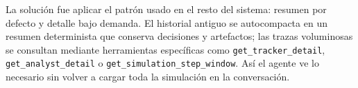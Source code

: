 La solución fue aplicar el patrón usado en el resto del sistema: resumen por
defecto y detalle bajo demanda. El historial antiguo se autocompacta en un
resumen determinista que conserva decisiones y artefactos; las trazas
voluminosas se consultan mediante herramientas específicas como
\texttt{get\_tracker\_detail}, \texttt{get\_analyst\_detail} o
\texttt{get\_simulation\_step\_window}. Así el agente ve lo necesario sin volver
a cargar toda la simulación en la conversación.
